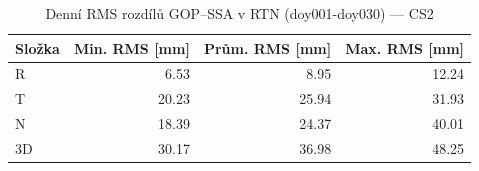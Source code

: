 \begin{table}[H]
\centering
\caption{Denní RMS rozdílů GOP–SSA v RTN (doy001-doy030) — CS2}
\label{tab:gop_vs_ssa_cs2_doy001-doy030_rms}
\begin{tabular}{lrrr}
\toprule
Složka & Min. RMS [mm] & Prům. RMS [mm] & Max. RMS [mm] \\
\midrule
R & 6.53 & 8.95 & 12.24 \\
T & 20.23 & 25.94 & 31.93 \\
N & 18.39 & 24.37 & 40.01 \\
3D & 30.17 & 36.98 & 48.25 \\
\bottomrule
\end{tabular}
\end{table}
